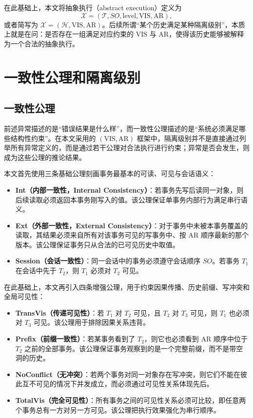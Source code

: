 在此基础上，本文将抽象执行（abstract execution）定义为
\[
    \mathcal{X} = (\mathcal{T}, SO, \text{level}, \text{VIS}, \text{AR}),
\]
或者简写为 $\mathcal{X} = (\mathcal{H}, \text{VIS}, \text{AR})$。后续所谓“某个历史满足某种隔离级别”，本质上就是在问：是否存在一组满足对应约束的 $\text{VIS}$ 与 $\text{AR}$，使得该历史能够被解释为一个合法的抽象执行。

\section{一致性公理和隔离级别}

\subsection{一致性公理}
前述异常描述的是“错误结果是什么样”，而一致性公理描述的是“系统必须满足哪些结构性约束”。在本文采用的 $(\text{VIS}, \text{AR})$ 框架中，隔离级别并不是直接通过列举所有异常定义的，而是通过若干公理对合法执行进行约束；异常是否会发生，则成为这些公理的推论结果。

本文首先使用三条基础公理刻画事务最基本的可读、可见与会话语义：
\begin{itemize}
    \item \textbf{Int（内部一致性，Internal Consistency）}：若事务先写后读同一对象，则后续读取必须返回本事务刚写入的值。该公理保证单事务内部行为满足串行语义。
    \item \textbf{Ext（外部一致性，External Consistency）}：对于事务中未被本事务覆盖的读取，其结果必须来自所有对该事务可见的写事务中、按 $\text{AR}$ 顺序最新的那个版本。该公理保证事务只从合法的已可见历史中取值。
    \item \textbf{Session（会话一致性）}：同一会话中的事务必须遵守会话顺序 $SO$。若事务 $T_1$ 在会话中先于 $T_2$，则 $T_1$ 必须对 $T_2$ 可见。
\end{itemize}

在此基础上，本文再引入四条增强公理，用于约束因果传播、历史前缀、写冲突和全局可见性：
\begin{itemize}
    \item \textbf{TransVis（传递可见性）}：若 $T_1$ 对 $T_2$ 可见，且 $T_2$ 对 $T_3$ 可见，则 $T_1$ 也必须对 $T_3$ 可见。该公理用于排除因果关系违背。
    \item \textbf{Prefix（前缀一致性）}：若某事务看到了 $T_2$，则它也必须看到 $\text{AR}$ 顺序中位于 $T_2$ 之前的全部事务。该公理保证事务观察到的是一个完整前缀，而不是带空洞的历史。
    \item \textbf{NoConflict（无冲突）}：若两个事务对同一对象存在写冲突，则它们不能在彼此互不可见的情况下并发成立，而必须通过可见性关系体现先后。
    \item \textbf{TotalVis（完全可见性）}：所有事务之间的可见性关系必须可比较，即任意两个事务总有一方对另一方可见。该公理把执行效果强化为串行顺序。
\end{itemize}

